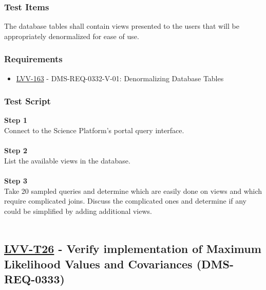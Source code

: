 \hypertarget{test-items-2}{%
\subsubsection{Test Items}\label{test-items-2}}

The database tables shall contain views presented to the users that will
be appropriately denormalized for ease of use.

\hypertarget{requirements-2}{%
\subsubsection{Requirements}\label{requirements-2}}

\begin{itemize}
\tightlist
\item
  \href{https://jira.lsstcorp.org/browse/LVV-163}{LVV-163} -
  DMS-REQ-0332-V-01: Denormalizing Database Tables
\end{itemize}

\hypertarget{test-script-2}{%
\subsubsection{Test Script}\label{test-script-2}}

\textbf{Step 1}\\
Connect to the Science Platform's portal query interface.\\
~\\
\textbf{Step 2}\\
List the available views in the database.\\
~\\
\textbf{Step 3}\\
{Take 20 sampled queries and determine which are easily done on views
and which require complicated joins. Discuss the complicated ones and
determine if any could be simplified by adding additional views.}\\
~\\

\hypertarget{lvv-t26---verify-implementation-of-maximum-likelihood-values-and-covariances-dms-req-0333}{%
\subsection{\texorpdfstring{\href{https://jira.lsstcorp.org/secure/Tests.jspa\#/testCase/LVV-T26}{LVV-T26}
- Verify implementation of Maximum Likelihood Values and Covariances
(DMS-REQ-0333)}{LVV-T26 - Verify implementation of Maximum Likelihood Values and Covariances (DMS-REQ-0333)}}\label{lvv-t26---verify-implementation-of-maximum-likelihood-values-and-covariances-dms-req-0333}}

